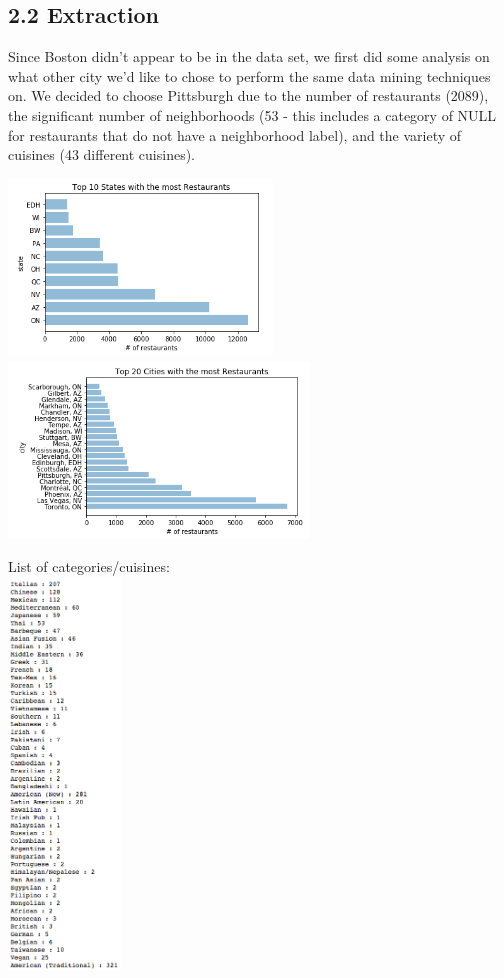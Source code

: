 \documentclass{neu_handout}
\begin{document}
\subsection*{2.2 Extraction}

Since Boston didn't appear to be in the data set, we first did some analysis on what other city we'd like to chose to perform the same data mining techniques on. We decided to choose Pittsburgh due to the number of restaurants (2089), the significant number of neighborhoods (53 - this includes a category of NULL for restaurants that do not have a neighborhood label), and the variety of cuisines (43 different cuisines).



\begin{center}
\includegraphics[width=70mm,scale=0.5]{states}
\includegraphics[width=80mm,scale=0.5]{cities}
\end{center}

\begin{center}
List of categories/cuisines: \\
\includegraphics[width=30mm,scale=0.5]{cuisines}\\
\end{center}
\end{document}
